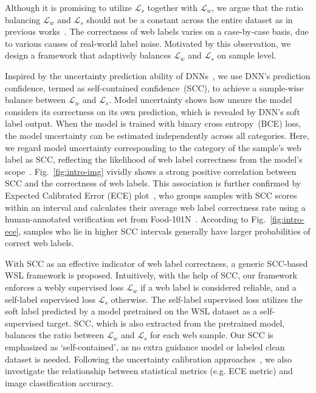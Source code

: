 \documentclass[runningheads]{llncs}
\begin{document}
Although it is promising to utilize $\mathcal{L}_s$ together with $\mathcal{L}_w$, we argue that the ratio balancing $\mathcal{L}_w$ and $\mathcal{L}_s$ should not be a constant across the entire dataset as in previous works~\cite{han2019deep,tanaka2018joint}. The correctness of web labels varies on a case-by-case basis, due to various causes of real-world label noise. Motivated by this observation, we design a framework that adaptively balances $\mathcal{L}_w$ and $\mathcal{L}_s$ on sample level.  

Inspired by the uncertainty prediction ability of DNNs~\cite{gal2016uncertainty}, we use DNN's prediction confidence, termed as self-contained confidence~(SCC), to achieve a sample-wise balance between $\mathcal{L}_w$ and $\mathcal{L}_s$. 
Model uncertainty shows how unsure the model considers its correctness on its own prediction, which is revealed by DNN's soft label output. 
When the model is trained with binary cross entropy~(BCE) loss, the model uncertainty can be estimated independently across all categories.
Here, we regard model uncertainty corresponding to the category of the sample's web label as SCC, reflecting the likelihood of web label correctness from the model's scope~\cite{gal2016uncertainty}.
Fig.~\ref{fig:intro-img} vividly shows a strong positive correlation between SCC and the correctness of web labels. This association is further confirmed by Expected Calibrated Error (ECE) plot~\cite{guo2017calibration}, who groups samples with SCC scores within an interval and calculates their average web label correctness rate using a human-annotated verification set from Food-101N~\cite{lee2018cleannet}. According to Fig.~\ref{fig:intro-ece}, samples who lie in higher SCC intervals generally have larger probabilities of correct web labels.

With SCC as an effective indicator of web label correctness, a generic SCC-based WSL framework is proposed. Intuitively, with the help of SCC, our framework enforces a webly supervised loss $\mathcal{L}_w$ if a web label is considered reliable, and a self-label supervised loss $\mathcal{L}_s$ otherwise. The self-label supervised loss utilizes the soft label predicted by a model pretrained on the WSL dataset as a self-supervised target. SCC, which is also extracted from the pretrained model, balances the ratio between $\mathcal{L}_w$ and $\mathcal{L}_s$ for each web sample. Our SCC is emphasized as `self-contained', as no extra guidance model or labeled clean dataset is needed. 
Following the uncertainty calibration approaches~\cite{guo2017calibration,thulasidasan2019mixup}, we also investigate the relationship between statistical metrics (e.g. ECE metric) and image classification accuracy.
\end{document}
